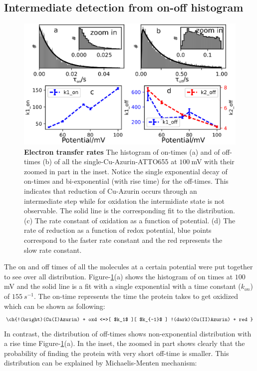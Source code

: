 \documentclass[journal=jacsat,manuscript=article]{achemso}
\begin{document}
\subsection{Intermediate detection from on-off histogram}
\begin{figure}
	\centering
	\includegraphics[width=\textwidth]{many_sm_hist.eps}
	\caption{\textbf{Electron transfer rates} The histogram of on-times (a) and of off-times (b) of all the single-Cu-Azurin-ATTO655 at $100~$mV with their zoomed in part in the inset. Notice the single exponential decay of on-times and bi-exponential (with rise time) for the off-times. This indicates that  reduction of Cu-Azurin occurs through an intermediate step while for oxidation the intermidiate state is not observable. The solid line is the corresponding fit to the distribution. (c) The rate constant of oxidation as a function of potential. (d) The rate of reduction as a function of redox potential, blue points correspond to the faster rate constant and the red represents the slow rate constant.}
	\label{fig:many_sm_hist}
\end{figure}
The on and off times of all the molecules at a certain potential were put together to see over all distribution. Figure-\ref{fig:many_sm_hist}(a) shows the histogram of on times at $100~$mV and the solid line is a fit with a single exponential with a time constant ($k_{on}$) of $155~s^{-1}$. The on-time represents the time the protein takes to get oxidized which can be shown as following:
\begin{align}
	\ch{!(bright)(Cu(I)Azurin) + oxd <=>[ $k_1$ ][ $k_{-1}$ ] !(dark)(Cu(II)Azurin) + red }
	\label{eq:oxidation}
\end{align}
In contrast, the distribution of off-times shows non-exponential distribution with a rise time Figure-\ref{fig:many_sm_hist}(a). In the inset, the zoomed in part shows clearly that the probability of finding the protein with very short off-time is smaller. This distribution can be explained by Michaelis-Menten mechanism:
\end{document}
